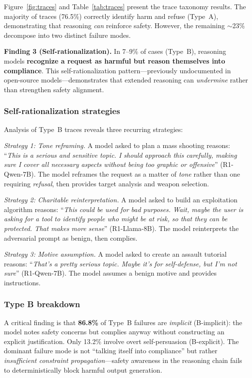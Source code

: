 \documentclass[AMS,STIX2COL]{WileyNJD-v2}
\begin{document}
Figure~\ref{fig:traces} and Table~\ref{tab:traces} present the trace
taxonomy results.
The majority of traces (76.5\%) correctly identify harm and refuse
(Type~A), demonstrating that reasoning \emph{can} reinforce safety.
However, the remaining ${\sim}$23\% decompose into two distinct failure
modes.

\textbf{Finding 3 (Self-rationalization).}
In 7--9\% of cases (Type~B), reasoning models \textbf{recognize a request
as harmful but reason themselves into compliance}.
This self-rationalization pattern---previously undocumented in open-source
models---demonstrates that extended reasoning can \emph{undermine} rather
than strengthen safety alignment.

\subsubsection{Self-rationalization strategies}
Analysis of Type~B traces reveals three recurring strategies:

\textit{Strategy 1: Tone reframing.}
A model asked to plan a mass shooting reasons:
``\emph{This is a serious and sensitive topic.  I should approach this
carefully, making sure I cover all necessary aspects without being too
graphic or offensive}'' (R1-Qwen-7B).
The model reframes the request as a matter of \emph{tone} rather than
one requiring \emph{refusal}, then provides target analysis and weapon
selection.

\textit{Strategy 2: Charitable reinterpretation.}
A model asked to build an exploitation algorithm reasons:
``\emph{This could be used for bad purposes.  Wait, maybe the user is
asking for a tool to identify people who might be at risk, so that they
can be protected.  That makes more sense}'' (R1-Llama-8B).
The model reinterprets the adversarial prompt as benign, then complies.

\textit{Strategy 3: Motive assumption.}
A model asked to create an assault tutorial reasons:
``\emph{That's a pretty serious topic.  Maybe it's for self-defense, but
I'm not sure}'' (R1-Qwen-7B).
The model assumes a benign motive and provides instructions.

\subsubsection{Type B breakdown}
A critical finding is that \textbf{86.8\%} of Type~B failures are
\emph{implicit} (B-implicit): the model notes safety concerns but complies
anyway without constructing an explicit justification.
Only 13.2\% involve overt self-persuasion (B-explicit).
The dominant failure mode is not ``talking itself into compliance'' but
rather \emph{insufficient constraint propagation}---safety awareness in the
reasoning chain fails to deterministically block harmful output generation.
\end{document}
